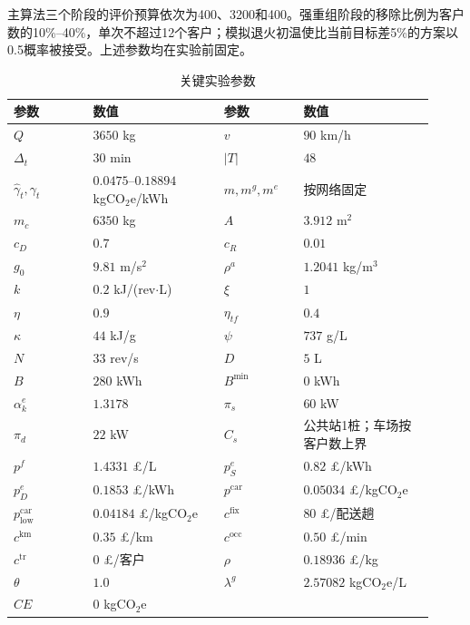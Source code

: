 \documentclass{setp-new}
\newcommand{\setptabsetup}{\fontsize{9pt}{10.5pt}\selectfont\renewcommand{\arraystretch}{0.90}\setlength{\tabcolsep}{2.2pt}\setlength{\aboverulesep}{0.4pt}\setlength{\belowrulesep}{0.4pt}\hbadness=10000}
\begin{document}
主算法三个阶段的评价预算依次为400、3200和400。强重组阶段的移除比例为客户数的10\%--40\%，单次不超过12个客户；模拟退火初温使比当前目标差5\%的方案以0.5概率被接受。上述参数均在实验前固定。

\begin{table}[tbp]
\centering
\caption{关键实验参数}
\label{tab:parameter-settings}
\setptabsetup
\begin{tabular}{@{}>{\centering\arraybackslash}p{0.17\linewidth}>{\centering\arraybackslash}p{0.29\linewidth}>{\centering\arraybackslash}p{0.17\linewidth}>{\centering\arraybackslash}p{0.29\linewidth}@{}}
\toprule
参数 & 数值 & 参数 & 数值\\
\midrule
$Q$ & $3650$ kg & $v$ & $90$ km/h\\
$\Delta_t$ & $30$ min & $|T|$ & $48$\\
$\widehat\gamma_t,\gamma_t$ & $0.0475$--$0.18894$ kgCO$_2$e/kWh & $m,m^g,m^e$ & 按网络固定\\
$m_c$ & $6350$ kg & $A$ & $3.912$ m$^2$\\
$c_D$ & $0.7$ & $c_R$ & $0.01$\\
$g_0$ & $9.81$ m/s$^2$ & $\rho^a$ & $1.2041$ kg/m$^3$\\
$k$ & $0.2$ kJ/(rev$\cdot$L) & $\xi$ & $1$\\
$\eta$ & $0.9$ & $\eta_{tf}$ & $0.4$\\
$\kappa$ & $44$ kJ/g & $\psi$ & $737$ g/L\\
$N$ & $33$ rev/s & $D$ & $5$ L\\
$B$ & $280$ kWh & $B^{\min}$ & $0$ kWh\\
$\alpha_k^e$ & $1.3178$ & $\pi_s$ & $60$ kW\\
$\pi_d$ & $22$ kW & $C_s$ & 公共站1桩；车场按客户数上界\\
$p^f$ & $1.4331$ £/L & $p_S^e$ & $0.82$ £/kWh\\
$p_D^e$ & $0.1853$ £/kWh & $p^{\mathrm{car}}$ & $0.05034$ £/kgCO$_2$e\\
$p^{\mathrm{car}}_{\mathrm{low}}$ & $0.04184$ £/kgCO$_2$e & $c^{\mathrm{fix}}$ & $80$ £/配送趟\\
$c^{\mathrm{km}}$ & $0.35$ £/km & $c^{\mathrm{occ}}$ & $0.50$ £/min\\
$c^{\mathrm{tr}}$ & $0$ £/客户 & $\rho$ & $0.18936$ £/kg\\
$\theta$ & $1.0$ & $\lambda^g$ & $2.57082$ kgCO$_2$e/L\\
$CE$ & $0$ kgCO$_2$e & & \\
\bottomrule
\end{tabular}
\end{table}
\end{document}

